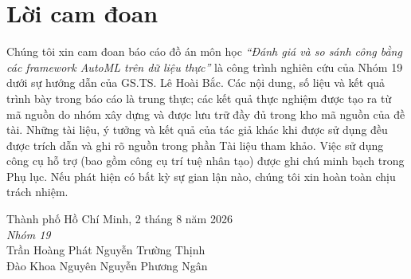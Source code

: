 \chapter*{Lời cam đoan}

Chúng tôi xin cam đoan báo cáo đồ án môn học \textit{``Đánh giá và so sánh công
bằng các framework AutoML trên dữ liệu thực''} là công trình nghiên cứu của Nhóm
19 dưới sự hướng dẫn của GS.TS. Lê Hoài Bắc. Các nội
dung, số liệu và kết quả trình bày trong báo cáo là trung thực; các kết quả thực
nghiệm được tạo ra từ mã nguồn do nhóm xây dựng và được lưu trữ đầy đủ trong kho
mã nguồn của đề tài. Những tài liệu, ý tưởng và kết quả của tác giả khác khi được
sử dụng đều được trích dẫn và ghi rõ nguồn trong phần Tài liệu tham khảo. Việc sử
dụng công cụ hỗ trợ (bao gồm công cụ trí tuệ nhân tạo) được ghi chú minh bạch
trong Phụ lục. Nếu phát hiện có bất kỳ sự gian lận nào, chúng tôi xin hoàn toàn
chịu trách nhiệm.

\vspace{1.5cm}
\hfill
\begin{minipage}{0.45\linewidth}
\centering
Thành phố Hồ Chí Minh, 2 tháng 8 năm 2026\\[0.3cm]
\textit{Nhóm 19}\\[2.5cm]
Trần Hoàng Phát \quad Nguyễn Trường Thịnh\\[0.3cm]
Đào Khoa Nguyên \quad Nguyễn Phương Ngân
\end{minipage}
